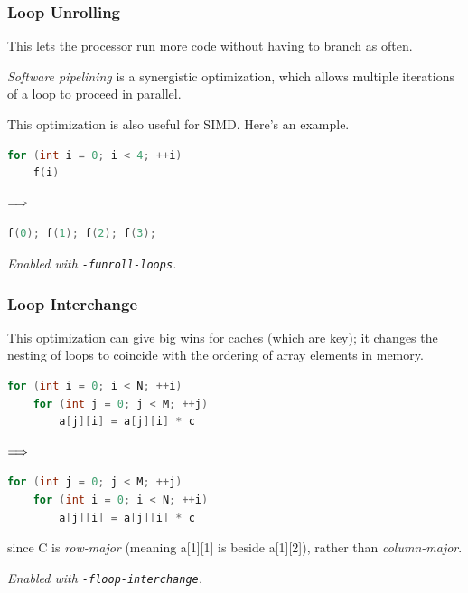 \begin{frame}[fragile]
\frametitle{Loop Unrolling}

This
lets the processor run more code without having to branch
as often. 

\emph{Software pipelining} is a synergistic optimization,
which allows multiple iterations of a loop to proceed in parallel.


This optimization is also useful for SIMD. Here's an example.
\begin{center}
\vspace*{-1em}
\begin{minipage}{.3\textwidth}
  \begin{lstlisting}[language=C]
for (int i = 0; i < 4; ++i)
    f(i)
  \end{lstlisting}
  \end{minipage} $\Longrightarrow \hspace*{2em}$ \begin{minipage}{.4\textwidth}
  \begin{lstlisting}[language=C]
f(0); f(1); f(2); f(3);
  \end{lstlisting}
  \end{minipage}
  \end{center}
\noindent \emph{Enabled with {\tt -funroll-loops}.}

\end{frame}

\begin{frame}[fragile]
\frametitle{Loop Interchange}

This optimization can give big wins
for caches (which are key); it changes the nesting of loops to
coincide with the ordering of array elements in memory. 


\begin{center}
\vspace*{-1em}
\begin{minipage}{.4\textwidth}
  \begin{lstlisting}[language=C]
for (int i = 0; i < N; ++i)
    for (int j = 0; j < M; ++j)
        a[j][i] = a[j][i] * c
  \end{lstlisting}
  \end{minipage} $\Longrightarrow \hspace*{2em}$ \begin{minipage}{.4\textwidth}
  \begin{lstlisting}[language=C]
for (int j = 0; j < M; ++j)
    for (int i = 0; i < N; ++i)
        a[j][i] = a[j][i] * c
  \end{lstlisting}
  \end{minipage}
  \end{center}
  since C is \emph{row-major} (meaning a[1][1] is beside a[1][2]),
rather than \emph{column-major}.

\noindent
\emph{Enabled with {\tt -floop-interchange}.}

\end{frame}

